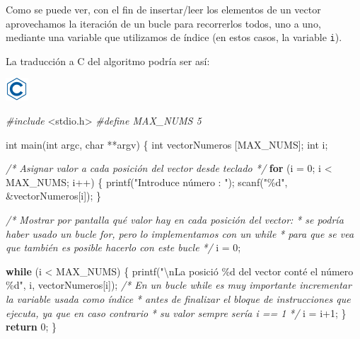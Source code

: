 \documentclass[
]{book}
\newenvironment{Shaded}{\begin{snugshade}}{\end{snugshade}}
\newcommand{\CommentTok}[1]{\textcolor[rgb]{0.56,0.35,0.01}{\textit{#1}}}
\newcommand{\ControlFlowTok}[1]{\textcolor[rgb]{0.13,0.29,0.53}{\textbf{#1}}}
\newcommand{\DataTypeTok}[1]{\textcolor[rgb]{0.13,0.29,0.53}{#1}}
\newcommand{\DecValTok}[1]{\textcolor[rgb]{0.00,0.00,0.81}{#1}}
\newcommand{\ImportTok}[1]{#1}
\newcommand{\NormalTok}[1]{#1}
\newcommand{\PreprocessorTok}[1]{\textcolor[rgb]{0.56,0.35,0.01}{\textit{#1}}}
\newcommand{\SpecialCharTok}[1]{\textcolor[rgb]{0.00,0.00,0.00}{#1}}
\newcommand{\StringTok}[1]{\textcolor[rgb]{0.31,0.60,0.02}{#1}}
\begin{document}
Como se puede ver, con el fin de insertar/leer los elementos de un vector aprovechamos la iteración de un bucle para recorrerlos todos, uno a uno, mediante una variable que utilizamos de índice (en estos casos, la variable \texttt{i}).

La traducción a C del algoritmo podría ser así:

\includegraphics{./img/c.png}

\begin{Shaded}
\begin{Highlighting}[]
\PreprocessorTok{\#include }\ImportTok{\textless{}stdio.h\textgreater{}}
\PreprocessorTok{\#define MAX\_NUMS 5}

\DataTypeTok{int}\NormalTok{ main(}\DataTypeTok{int}\NormalTok{ argc, }\DataTypeTok{char}\NormalTok{ **argv) \{}
    \DataTypeTok{int}\NormalTok{ vectorNumeros [MAX\_NUMS];}
    \DataTypeTok{int}\NormalTok{ i;}

    \CommentTok{/* Asignar valor a cada posición del vector desde teclado */}
    \ControlFlowTok{for}\NormalTok{ (i = }\DecValTok{0}\NormalTok{; i \textless{} MAX\_NUMS; i++) \{}
\NormalTok{        printf(}\StringTok{"Introduce número : "}\NormalTok{);}
\NormalTok{        scanf(}\StringTok{"\%d"}\NormalTok{, \&vectorNumeros[i]);}
\NormalTok{    \}}

    \CommentTok{/* Mostrar por pantalla qué valor hay en cada posición del vector:}
\CommentTok{     * se podría haber usado un bucle for, pero lo implementamos con un while}
\CommentTok{     * para que se vea que también es posible hacerlo con este bucle}
\CommentTok{     */}
\NormalTok{    i = }\DecValTok{0}\NormalTok{;}

    \ControlFlowTok{while}\NormalTok{ (i \textless{} MAX\_NUMS) \{}
\NormalTok{        printf(}\StringTok{"}\SpecialCharTok{\textbackslash{}n}\StringTok{La posició \%d del vector conté el número \%d"}\NormalTok{, i, vectorNumeros[i]);}
        \CommentTok{/* En un bucle while es muy importante incrementar la variable usada como índice}
\CommentTok{         * antes de finalizar el bloque de instrucciones que ejecuta, ya que en caso contrario}
\CommentTok{         * su valor sempre sería i == 1}
\CommentTok{         */}
\NormalTok{        i = i+}\DecValTok{1}\NormalTok{;}
\NormalTok{    \}}
    \ControlFlowTok{return} \DecValTok{0}\NormalTok{;}
\NormalTok{\}}
\end{Highlighting}
\end{Shaded}
\end{document}
